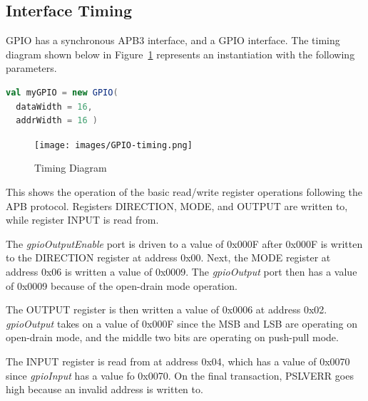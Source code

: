 

\newpage
\subsection{Interface Timing}

GPIO has a synchronous APB3 interface, and a GPIO interface. The timing diagram shown below
in Figure~\ref{fig:timing} represents an instantiation with the following
parameters.

\begin{lstlisting}[language=Scala]
val myGPIO = new GPIO(
  dataWidth = 16, 
  addrWidth = 16 ) 
\end{lstlisting}

\begin{figure}[h]
  \texttt{[image: images/GPIO-timing.png]}
  \caption{Timing Diagram}\label{fig:timing}
\end{figure}

This shows the operation of the basic read/write register operations following the APB protocol. Registers DIRECTION, MODE, and OUTPUT are
written to, while register INPUT is read from.

The \textit{gpioOutputEnable} port is driven to a value of 0x000F after 0x000F is written to the DIRECTION register 
at address 0x00. Next, the MODE register at address 0x06 is written a value of 0x0009. The \textit{gpioOutput} port 
then has a value of 0x0009 because of the open-drain mode operation. 

The OUTPUT register is then written a value of 0x0006 at address 0x02. \textit{gpioOutput} takes on a value of 0x000F
since the MSB and LSB are operating on open-drain mode, and the middle two bits are operating on push-pull mode. 

The INPUT register is read from at address 0x04, which has a value of 0x0070 since \textit{gpioInput} has a value fo 0x0070.
On the final transaction, PSLVERR goes high because an invalid address is written to.
